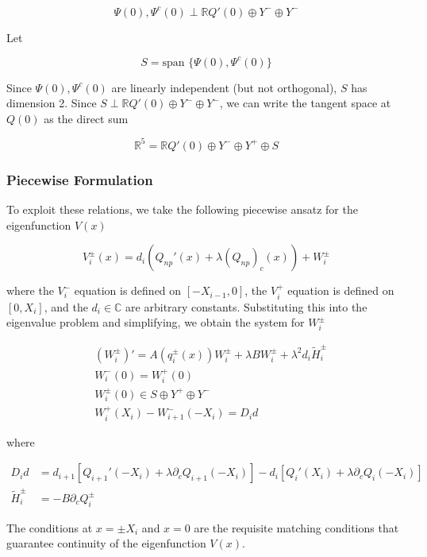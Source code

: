 \documentclass[12pt]{article}
\def\R{{\mathbb R}}
\def\C{{\mathbb C}}
\begin{document}
\[
\Psi(0), \Psi^c(0) \perp \R Q'(0) \oplus Y^- \oplus Y^-
\]

Let 

\begin{equation}
S = \text{span }\{ \Psi(0), \Psi^c(0) \}
\end{equation}

Since $\Psi(0), \Psi^c(0)$ are linearly independent (but not orthogonal), $S$ has dimension 2. Since $S \perp \R Q'(0) \oplus Y^- \oplus Y^-$, we can write the tangent space at $Q(0)$ as the direct sum

\begin{equation}
\R^5 = \R Q'(0) \oplus Y^- \oplus Y^+ \oplus S
\end{equation}

\subsubsection{Piecewise Formulation}

To exploit these relations, we take the following piecewise ansatz for the eigenfunction $V(x)$

\begin{equation}
V_i^\pm(x) = d_i (Q_{np}'(x) + \lambda (Q_{np})_c(x)) + W_i^\pm 
\end{equation}

where the $V_i^-$ equation is defined on $[-X_{i-1}, 0]$, the $V_i^+$ equation is defined on $[0, X_i]$, and the $d_i \in \C$ are arbitrary constants. Substituting this into the eigenvalue problem and simplifying, we obtain the system for $W_i^\pm$

\begin{align*}
&(W_i^\pm)' = A( q_i^\pm(x) ) W_i^\pm + \lambda B W_i^\pm + \lambda^2 d_i \tilde{H}_i^\pm \\
&W_i^-(0) = W_i^+(0) \\
&W_i^\pm(0) \in S \oplus Y^+ \oplus Y^- \\
&W_i^+(X_i) - W_{i+1}^-(-X_i) = D_i d
\end{align*}

where

\begin{align*}
D_i d &= d_{i+1}[Q_{i+1}'(-X_i) + \lambda \partial_c Q_{i+1}(-X_i)]
- d_i [ Q_i'(X_i) + \lambda \partial_c Q_i(-X_i) ] \\
\tilde{H}_i^\pm &= -B \partial_c Q_i^\pm
\end{align*}

The conditions at $x = \pm X_i$ and $x = 0$ are the requisite matching conditions that guarantee continuity of the eigenfunction $V(x)$.\\
\end{document}
